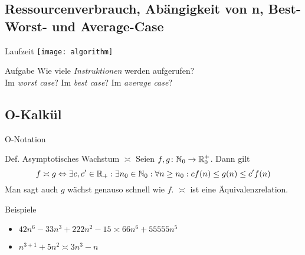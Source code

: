 \newcommand{\Rplus}{\ensuremath{\nR_+}}
\newcommand{\Rnullplus}{\ensuremath{\nR^+_0}}

\subsection{Ressourcenverbrauch, Abängigkeit von n, Best- Worst- und Average-Case}
\begin{frame}{Laufzeit}
\centering\texttt{[image: algorithm]}

\begin{exampleblock}{Aufgabe}
	Wie viele \emph{Instruktionen} werden aufgerufen? \\%
	\pause
	Im \emph{worst case}? Im \emph{best case}? Im \emph{average case}?
\end{exampleblock}
\end{frame}

\subsection{O-Kalkül}
\begin{frame}{O-Notation}
	\begin{block}{Def. Asymptotisches Wachstum $\asymp$}
		Seien $f,g \from \nN_0 \to \Rnullplus$. Dann gilt
		\[
			f \asymp g \Leftrightarrow \exists c,c'\in \Rplus: \exists n_0\in \nN_0: \forall n\geq n_0: c f(n) \leq g(n) \leq c' f(n)
		\]
		Man sagt auch $g$ wächst genauso schnell wie $f$. $\asymp$ ist eine Äquivalenzrelation.
	\end{block}

	\begin{exampleblock}{Beispiele}
		\begin{itemize}
			\item $42n^6-33n^3+222n^2 -15 \asymp 66n^6+55555n^5$
			\item $n^{3+1}+5n^2\asymp 3n^3-n$
		\end{itemize}
	\end{exampleblock}
\end{frame}

